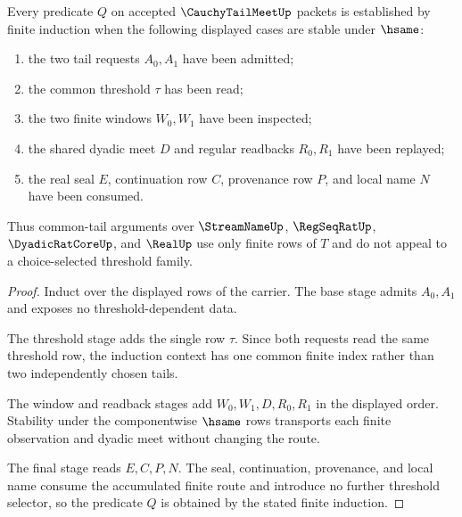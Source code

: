 \begin{theorem}
\label{thm:cauchy-tail-meet-finite-induction}
Every predicate $Q$ on accepted $\CauchyTailMeetUp$ packets is established by finite induction when the following displayed cases are stable under $\hsame$:
\begin{enumerate}
\item the two tail requests $A_0,A_1$ have been admitted;
\item the common threshold $\tau$ has been read;
\item the two finite windows $W_0,W_1$ have been inspected;
\item the shared dyadic meet $D$ and regular readbacks $R_0,R_1$ have been replayed;
\item the real seal $E$, continuation row $C$, provenance row $P$, and local name $N$ have been consumed.
\end{enumerate}
Thus common-tail arguments over $\StreamNameUp$, $\RegSeqRatUp$, $\DyadicRatCoreUp$, and $\RealUp$ use only finite rows of $T$ and do not appeal to a choice-selected threshold family.
\end{theorem}
\begin{proof}
Induct over the displayed rows of the carrier. The base stage admits $A_0,A_1$ and exposes no threshold-dependent data.

The threshold stage adds the single row $\tau$. Since both requests read the same threshold row, the induction context has one common finite index rather than two independently chosen tails.

The window and readback stages add $W_0,W_1,D,R_0,R_1$ in the displayed order. Stability under the componentwise $\hsame$ rows transports each finite observation and dyadic meet without changing the route.

The final stage reads $E,C,P,N$. The seal, continuation, provenance, and local name consume the accumulated finite route and introduce no further threshold selector, so the predicate $Q$ is obtained by the stated finite induction.
\end{proof}


